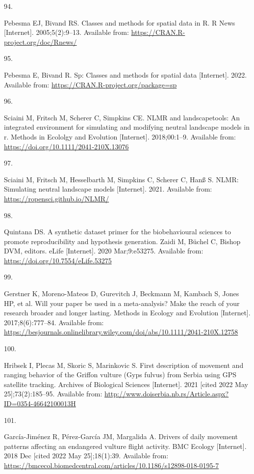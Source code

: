 \documentclass[10pt,a4paper]{article}
\newlength{\cslhangindent}
\newlength{\csllabelwidth}
\newenvironment{CSLReferences}[2] %
{\begin{list}{}{%
	\setlength{\itemindent}{0pt}
	\setlength{\leftmargin}{0pt}
	\setlength{\parsep}{0pt}
	\ifodd #1
	\setlength{\leftmargin}{\cslhangindent}
	\setlength{\itemindent}{-1\cslhangindent}
	\fi
	\setlength{\itemsep}{#2\baselineskip}}}
{\end{list}}
\newcommand{\CSLLeftMargin}[1]{\parbox[t]{\csllabelwidth}{\strut#1\strut}}
\newcommand{\CSLRightInline}[1]{\parbox[t]{\linewidth - \csllabelwidth}{\strut#1\strut}}
\begin{document}
\begin{CSLReferences}{0}{1}
\CSLLeftMargin{94. }%
\CSLRightInline{Pebesma EJ, Bivand RS. Classes and methods for spatial data in {R}. R News {[}Internet{]}. 2005;5(2):9--13. Available from: \url{https://CRAN.R-project.org/doc/Rnews/}}

\CSLLeftMargin{95. }%
\CSLRightInline{Pebesma E, Bivand R. Sp: Classes and methods for spatial data {[}Internet{]}. 2022. Available from: \url{https://CRAN.R-project.org/package=sp}}

\CSLLeftMargin{96. }%
\CSLRightInline{Sciaini M, Fritsch M, Scherer C, Simpkins CE. NLMR and landscapetools: An integrated environment for simulating and modifying neutral landscape models in r. Methods in Ecololgy and Evolution {[}Internet{]}. 2018;00:1--9. Available from: \url{https://doi.org/10.1111/2041-210X.13076}}

\CSLLeftMargin{97. }%
\CSLRightInline{Sciaini M, Fritsch M, Hesselbarth M, Simpkins C, Scherer C, Hanß S. NLMR: Simulating neutral landscape models {[}Internet{]}. 2021. Available from: \url{https://ropensci.github.io/NLMR/}}

\CSLLeftMargin{98. }%
\CSLRightInline{Quintana DS. A synthetic dataset primer for the biobehavioural sciences to promote reproducibility and hypothesis generation. Zaidi M, Büchel C, Bishop DVM, editors. eLife {[}Internet{]}. 2020 Mar;9:e53275. Available from: \url{https://doi.org/10.7554/eLife.53275}}

\CSLLeftMargin{99. }%
\CSLRightInline{Gerstner K, Moreno-Mateos D, Gurevitch J, Beckmann M, Kambach S, Jones HP, et al. Will your paper be used in a meta-analysis? Make the reach of your research broader and longer lasting. Methods in Ecology and Evolution {[}Internet{]}. 2017;8(6):777--84. Available from: \url{https://besjournals.onlinelibrary.wiley.com/doi/abs/10.1111/2041-210X.12758}}

\CSLLeftMargin{100. }%
\CSLRightInline{Hribsek I, Plecas M, Skoric S, Marinkovic S. First description of movement and ranging behavior of the {Griffon} vulture ({Gyps} fulvus) from {Serbia} using {GPS} satellite tracking. Archives of Biological Sciences {[}Internet{]}. 2021 {[}cited 2022 May 25{]};73(2):185--95. Available from: \url{http://www.doiserbia.nb.rs/Article.aspx?ID=0354-46642100013H}}

\CSLLeftMargin{101. }%
\CSLRightInline{García-Jiménez R, Pérez-García JM, Margalida A. Drivers of daily movement patterns affecting an endangered vulture flight activity. BMC Ecology {[}Internet{]}. 2018 Dec {[}cited 2022 May 25{]};18(1):39. Available from: \url{https://bmcecol.biomedcentral.com/articles/10.1186/s12898-018-0195-7}}


\end{CSLReferences}
\end{document}
